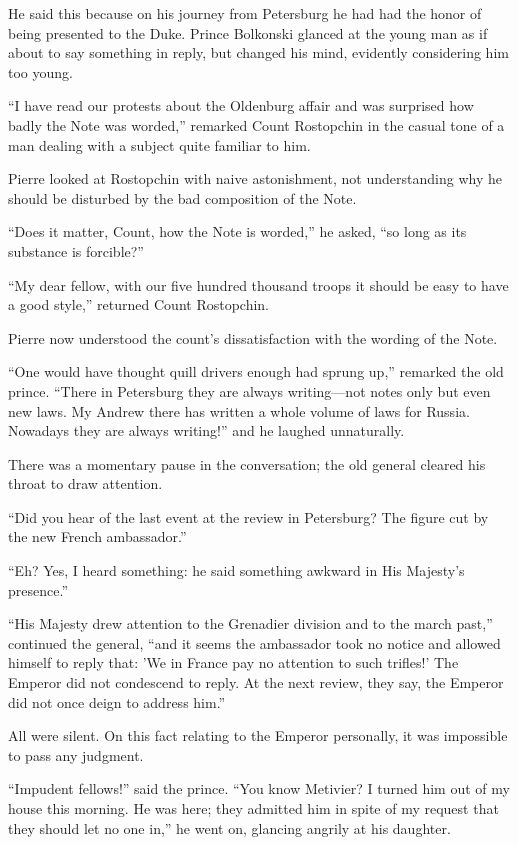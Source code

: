 He said this because on his journey from Petersburg he had had
the honor of being presented to the Duke. Prince Bolkonski
glanced at the young man as if about to say something in reply,
but changed his mind, evidently considering him too young.

``I have read our protests about the Oldenburg affair and was
surprised how badly the Note was worded,'' remarked Count
Rostopchin in the casual tone of a man dealing with a subject
quite familiar to him.

Pierre looked at Rostopchin with naive astonishment, not
understanding why he should be disturbed by the bad composition
of the Note.

``Does it matter, Count, how the Note is worded,'' he asked, ``so
long as its substance is forcible?''

``My dear fellow, with our five hundred thousand troops it should
be easy to have a good style,'' returned Count Rostopchin.

Pierre now understood the count's dissatisfaction with the
wording of the Note.

``One would have thought quill drivers enough had sprung up,''
remarked the old prince. ``There in Petersburg they are always
writing---not notes only but even new laws. My Andrew there has
written a whole volume of laws for Russia. Nowadays they are
always writing!'' and he laughed unnaturally.

There was a momentary pause in the conversation; the old general
cleared his throat to draw attention.

``Did you hear of the last event at the review in Petersburg? The
figure cut by the new French ambassador.''

``Eh? Yes, I heard something: he said something awkward in His
Majesty's presence.''

``His Majesty drew attention to the Grenadier division and to the
march past,'' continued the general, ``and it seems the
ambassador took no notice and allowed himself to reply that: 'We
in France pay no attention to such trifles!' The Emperor did not
condescend to reply. At the next review, they say, the Emperor
did not once deign to address him.''

All were silent. On this fact relating to the Emperor personally,
it was impossible to pass any judgment.

``Impudent fellows!'' said the prince. ``You know Metivier? I
turned him out of my house this morning. He was here; they
admitted him in spite of my request that they should let no one
in,'' he went on, glancing angrily at his daughter.

